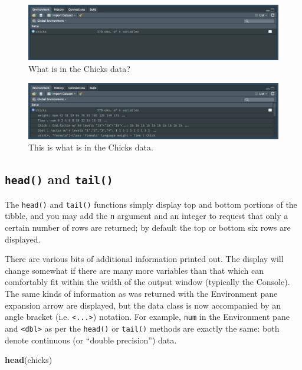 \documentclass[english,10pt,a4paper,oneside]{book}
\newenvironment{Shaded}{\begin{snugshade}}{\end{snugshade}}
\newcommand{\KeywordTok}[1]{\textcolor[rgb]{0.13,0.29,0.53}{\textbf{#1}}}
\newcommand{\NormalTok}[1]{#1}
\theoremstyle{definition}
\theoremstyle{definition}
\theoremstyle{definition}
\theoremstyle{remark}
\begin{document}
\begin{figure}[h!]
\begin{center}
\includegraphics[width=0.7\linewidth]{figures/chicks_1}
\end{center}
\caption{What is in the Chicks data?}
\end{figure}

\begin{figure}[h!]
\begin{center}
\includegraphics[width=0.7\linewidth]{figures/chicks_2}
\end{center}
\caption{This is what is in the Chicks data.}
\end{figure}

\hypertarget{head-and-tail}{%
\subsection{\texorpdfstring{\texttt{head()} and
\texttt{tail()}}{head() and tail()}}\label{head-and-tail}}

The \texttt{head()} and \texttt{tail()} functions simply display top and
bottom portions of the tibble, and you may add the \texttt{n} argument
and an integer to request that only a certain number of rows are
returned; by default the top or bottom six rows are displayed.

There are various bits of additional information printed out. The
display will change somewhat if there are many more variables than that
which can comfortably fit within the width of the output window
(typically the Console). The same kinds of information as was returned
with the Environment pane expansion arrow are displayed, but the data
class is now accompanied by an angle bracket (i.e.
\texttt{\textless{}...\textgreater{}}) notation. For example,
\texttt{num} in the Environment pane and
\texttt{\textless{}dbl\textgreater{}} as per the \texttt{head()} or
\texttt{tail()} methods are exactly the same: both denote continuous (or
\enquote{double precision}) data.

\begin{Shaded}
\begin{Highlighting}[]
\KeywordTok{head}\NormalTok{(chicks)}
\end{Highlighting}
\end{Shaded}
\end{document}
